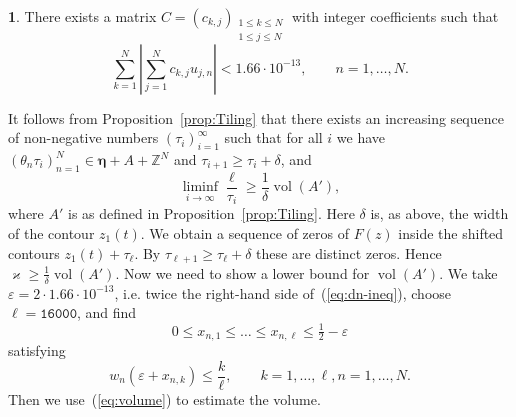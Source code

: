 \documentclass[oneside,english]{amsart}
\numberwithin{equation}{section}
\numberwithin{figure}{section}
\theoremstyle{plain}
\theoremstyle{plain}
\theoremstyle{plain}
\theoremstyle{definition}
\newtheorem{claim}{\protect\claimname}
\providecommand{\claimname}{Claim}
\begin{document}
\begin{claim}
\label{claim:Algorithm1}There exists a matrix $C=\left(c_{k,j}\right)_{\substack{1\leq k\leq N\\
1\leq j\leq N
}
}$ with integer coefficients such that
\begin{equation}
\sum_{k=1}^{N}\left|\sum_{j=1}^{N}c_{k,j}u_{j,n}\right|<1.66\cdot10^{-13},\qquad n=1,\dotsc,N.\label{eq:dn-ineq}
\end{equation}
\end{claim}
It follows from Proposition~\ref{prop:Tiling} that there exists
an increasing sequence of non-negative numbers $(\tau_{i})_{i=1}^{\infty}$
such that for all $i$ we have $\left(\theta_{n}\tau_{i}\right)_{n=1}^{N}\in\boldsymbol{\eta}+A+\mathbb{Z}^{N}$
and $\tau_{i+1}\geq\tau_{i}+\delta$, and 
\[
\liminf_{i\to\infty}\frac{\ell}{\tau_{i}}\geq\frac{1}{\delta}\operatorname{vol}(A'),
\]
where $A'$ is as defined in Proposition~\ref{prop:Tiling}. Here
$\delta$ is, as above, the width of the contour $z_{1}(t)$. We obtain
a sequence of zeros of $F(z)$ inside the shifted contours $z_{1}(t)+\tau_{\ell}$.
By $\tau_{\ell+1}\geq\tau_{\ell}+\delta$ these are distinct zeros.
Hence $\varkappa\geq\frac{1}{\delta}\operatorname{vol}(A')$. Now
we need to show a lower bound for $\operatorname{vol}(A')$. We take
$\varepsilon=2\cdot1.66\cdot10^{-13}$, i.e. twice the right-hand
side of~(\ref{eq:dn-ineq}), choose $\ell=\mathtt{16000}$, and find
\begin{equation}
0\leq x_{n,1}\leq\dotsc\leq x_{n,\ell}\leq\tfrac{1}{2}-\varepsilon\label{eq:x-inequalities}
\end{equation}
satisfying 
\begin{equation}
w_{n}\left(\varepsilon+x_{n,k}\right)\leq\frac{k}{\ell},\qquad k=1,\dotsc,\ell,n=1,\dotsc,N.\label{eq:wn-inequalities}
\end{equation}
Then we use~(\ref{eq:volume}) to estimate the volume.
\end{document}
